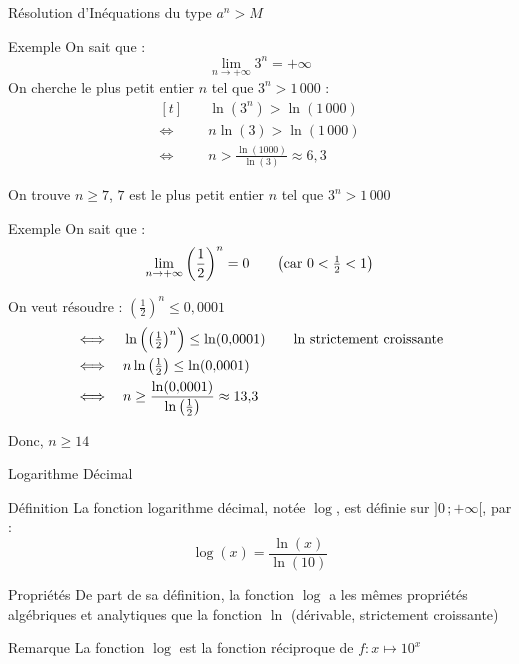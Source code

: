 \documentclass{cours}
\begin{document}
    \begin{Gpartie}{Résolution d'Inéquations du type $a^n>M$}
        \begin{Spartie}{Exemple}
            On sait que : \[\lim_{n\to+\infty}3^n=+\infty\]
            On cherche le plus petit entier $n$ tel que $3^n>1\,000$ :
            \[\begin{aligned}[t]
                &\quad\ln(3^n)>\ln(1\,000) \\
                \iff&\quad n\ln(3)>\ln(1\,000) \\
                \iff&\quad n>\frac{\ln(1000)}{\ln(3)}\approx 6{,}3
            \end{aligned}\]

            On trouve $n\geq 7$, $7$ est le plus petit entier $n$ tel que $3^n>1\,000$
        \end{Spartie}
        \begin{Spartie}{Exemple}
            On sait que : \[\lim_{n\to+\infty}\left(\frac{1}{2}\right)^n=0\text{\qquad \big(car $0<\tfrac{1}{2}<1$\big)}\]
            
            On veut résoudre : $\left(\frac{1}{2}\right)^n\leq 0{,}0001$
            \[\begin{aligned}[t]
                \iff&\quad\ln\Big(\big(\tfrac{1}{2}\big)^n\Big)\leq\ln(0{,}0001)\text{\qquad $\ln$ strictement croissante} \\
                \iff&\quad n\ln\big(\tfrac{1}{2}\big)\leq\ln(0{,}0001) \\
                \iff&\quad n\geq\frac{\ln(0{,}0001)}{\ln\left(\frac{1}{2}\right)}\approx13{,}3
            \end{aligned}\]

            Donc, $n\geq 14$
        \end{Spartie}
    \end{Gpartie}
    \pagebreak
    \begin{Gpartie}{Logarithme Décimal} 
        \begin{Spartie}{Définition} 
            La fonction logarithme décimal, notée $\log$, est définie sur $\big]0\,;+\infty\big[$, par :
            \[\log(x)=\frac{\ln(x)}{\ln(10)}\]

        \end{Spartie}
        \begin{Spartie}{Propriétés} 
            De part de sa définition, la fonction $\log$ a les mêmes propriétés algébriques et analytiques que la fonction $\ln$ (dérivable, strictement croissante) 
        \end{Spartie}
        \begin{Spartie}{Remarque} 
            La fonction $\log$ est la fonction réciproque de $f:x\mapsto 10^x$
        \end{Spartie}
    \end{Gpartie}
\end{document}
